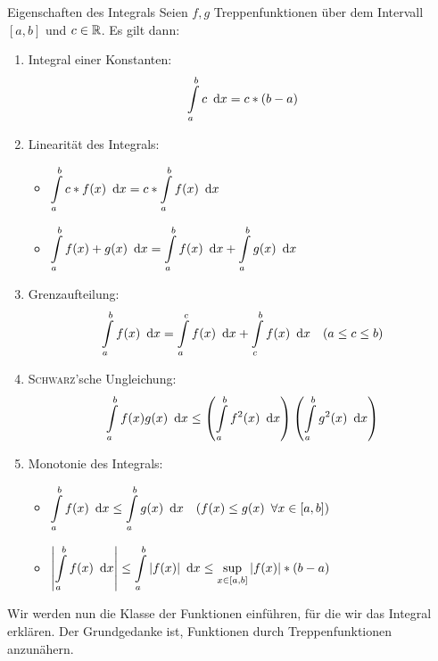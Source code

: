 \begin{satz}{Eigenschaften des Integrals}
	Seien $f,g$ Treppenfunktionen über dem Intervall $[a,b]$ und $c\in\mathbb{R}$. Es gilt dann:
	\begin{enumerate}
		\item Integral einer Konstanten:
		\begin{equation*}
			\int\limits_a^b c\ \operatorname{d}\! x = c*(b-a)
		\end{equation*}
		\item Linearität des Integrals:
		\begin{itemize}
			\item $\displaystyle\int\limits_a^b c*f(x)\ \operatorname{d}\! x=c*\int\limits_a^b f(x)\ \operatorname{d}\! x$
			\item $\displaystyle\int\limits_a^b f(x)+g(x) \ \operatorname{d}\! x = \int\limits_a^b f(x) \ \operatorname{d}\! x+\int\limits_a^b g(x) \ \operatorname{d}\! x$
		\end{itemize}
		\item Grenzaufteilung:
		\begin{equation*}
			\int\limits_a^b f(x)\ \operatorname{d}\! x=\int\limits_a^c f(x)\ \operatorname{d}\! x+\int\limits_c^b f(x)\ \operatorname{d}\! x \quad (a\leq c\leq b)
		\end{equation*}
		\item \textsc{Schwarz}'sche Ungleichung:
		\begin{equation*}
			\int\limits_a^b f(x)g(x)\ \operatorname{d}\! x
				\leq \left(\int\limits_a^b f^2(x)\ \operatorname{d}\! x\right)\left(\int\limits_a^b g^2(x)\ \operatorname{d}\! x\right)
		\end{equation*}
		\item Monotonie des Integrals:
		\begin{itemize}
			\item $\displaystyle\int\limits_a^b f(x)\ \operatorname{d}\! x\leq \int\limits_a^b g(x)\ \operatorname{d}\! x \quad (f(x)\leq g(x) \enspace\forall x\in[a,b])$
			\item $\displaystyle\left|\int\limits_a^b f(x)\ \operatorname{d}\! x\right|\leq \int\limits_a^b |f(x)|\ \operatorname{d}\! x\leq \sup_{x\in[a,b]}|f(x)|*(b-a)$
		\end{itemize}
	\end{enumerate}
\end{satz}

Wir werden nun die Klasse der Funktionen einführen, für die wir das Integral erklären. Der Grundgedanke ist, Funktionen durch Treppenfunktionen anzunähern.

